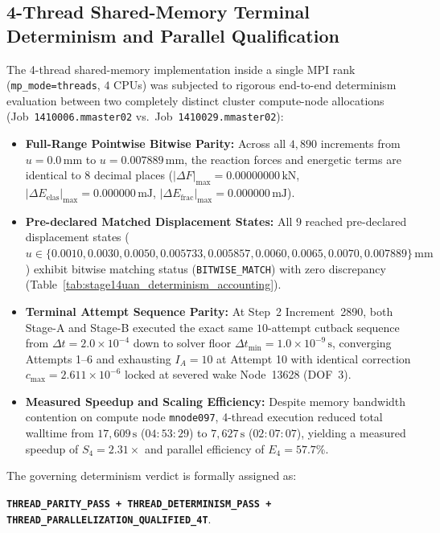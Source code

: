 \subsection{4-Thread Shared-Memory Terminal Determinism and Parallel Qualification}
\label{subsec:stage14uan_4thread_qualification}

The 4-thread shared-memory implementation inside a single MPI rank (\texttt{mp\_mode=threads}, $4$ CPUs) was subjected to rigorous end-to-end determinism evaluation between two completely distinct cluster compute-node allocations (Job~\texttt{1410006.mmaster02} vs.\ Job~\texttt{1410029.mmaster02}):
\begin{itemize}
  \item \textbf{Full-Range Pointwise Bitwise Parity:} Across all $4{,}890$ increments from $u = 0.0\,\mathrm{mm}$ to $u = 0.007889\,\mathrm{mm}$, the reaction forces and energetic terms are identical to $8$ decimal places ($|\Delta F|_{\max} = 0.00000000\,\mathrm{kN}$, $|\Delta E_{\mathrm{elas}}|_{\max} = 0.000000\,\mathrm{mJ}$, $|\Delta E_{\mathrm{frac}}|_{\max} = 0.000000\,\mathrm{mJ}$).
  \item \textbf{Pre-declared Matched Displacement States:} All $9$ reached pre-declared displacement states ($u \in \{0.0010, 0.0030, 0.0050, 0.005733, 0.005857, 0.0060, 0.0065, 0.0070, 0.007889\}\,\mathrm{mm}$) exhibit bitwise matching status (\texttt{BITWISE\_MATCH}) with zero discrepancy (Table~\ref{tab:stage14uan_determinism_accounting}).
  \item \textbf{Terminal Attempt Sequence Parity:} At Step~2 Increment~2890, both Stage-A and Stage-B executed the exact same $10$-attempt cutback sequence from $\Delta t = 2.0\times 10^{-4}$ down to solver floor $\Delta t_{\min} = 1.0\times 10^{-9}\,\mathrm{s}$, converging Attempts 1--6 and exhausting $I_A = 10$ at Attempt 10 with identical correction $c_{\max} = 2.611\times 10^{-6}$ locked at severed wake Node~13628 (DOF~3).
  \item \textbf{Measured Speedup and Scaling Efficiency:} Despite memory bandwidth contention on compute node \texttt{mnode097}, 4-thread execution reduced total walltime from $17{,}609\,\mathrm{s}$ ($04:53:29$) to $7{,}627\,\mathrm{s}$ ($02:07:07$), yielding a measured speedup of $S_4 = 2.31\times$ and parallel efficiency of $E_4 = 57.7\%$.
\end{itemize}

The governing determinism verdict is formally assigned as:
\begin{center}
{\footnotesize\textbf{\texttt{THREAD\_PARITY\_PASS + THREAD\_DETERMINISM\_PASS + THREAD\_PARALLELIZATION\_QUALIFIED\_4T}}}.
\end{center}

